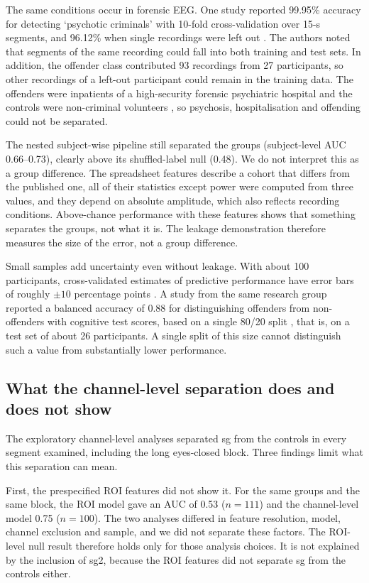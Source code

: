 The same conditions occur in forensic EEG. One study reported 99.95\% accuracy for detecting `psychotic criminals' with 10-fold cross-validation over 15-s segments, and 96.12\% when single recordings were left out \cite{Tasci2025}. The authors noted that segments of the same recording could fall into both training and test sets. In addition, the offender class contributed 93 recordings from 27 participants, so other recordings of a left-out participant could remain in the training data. The offenders were inpatients of a high-security forensic psychiatric hospital and the controls were non-criminal volunteers \cite{Tasci2025}, so psychosis, hospitalisation and offending could not be separated.

The nested subject-wise pipeline still separated the groups (subject-level AUC 0.66--0.73), clearly above its shuffled-label null (0.48). We do not interpret this as a group difference. The spreadsheet features describe a cohort that differs from the published one, all of their statistics except power were computed from three values, and they depend on absolute amplitude, which also reflects recording conditions. Above-chance performance with these features shows that something separates the groups, not what it is. The leakage demonstration therefore measures the size of the error, not a group difference.

Small samples add uncertainty even without leakage. With about 100 participants, cross-validated estimates of predictive performance have error bars of roughly $\pm 10$ percentage points \cite{Varoquaux2018}. A study from the same research group reported a balanced accuracy of 0.88 for distinguishing offenders from non-offenders with cognitive test scores, based on a single 80/20 split \cite{Bonfante2023}, that is, on a test set of about 26 participants. A single split of this size cannot distinguish such a value from substantially lower performance.

\subsection{What the channel-level separation does and does not show}
\label{sec:disc-separation}

The exploratory channel-level analyses separated sg from the controls in every segment examined, including the long eyes-closed block. Three findings limit what this separation can mean.

First, the prespecified ROI features did not show it. For the same groups and the same block, the ROI model gave an AUC of 0.53 ($n = 111$) and the channel-level model 0.75 ($n = 100$). The two analyses differed in feature resolution, model, channel exclusion and sample, and we did not separate these factors. The ROI-level null result therefore holds only for those analysis choices. It is not explained by the inclusion of sg2, because the ROI features did not separate sg from the controls either.

